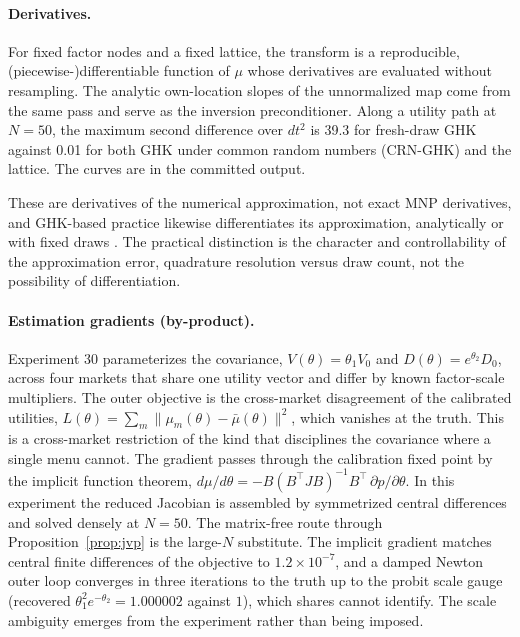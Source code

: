 \documentclass[12pt]{article}
\theoremstyle{remark}
\begin{document}
\paragraph{Derivatives.} For fixed factor nodes and a fixed
lattice, the transform is a reproducible, (piecewise-)differentiable function
of $\mu$ whose derivatives are evaluated without resampling. The analytic own-location slopes of the unnormalized map come from the same pass and serve as the inversion preconditioner. Along a utility path at $N=50$, the maximum second difference over
$dt^2$ is 39.3 for fresh-draw GHK against 0.01 for both GHK under common
random numbers (CRN-GHK) and the lattice. The curves are in the
committed output.

These are derivatives of the numerical
approximation, not exact MNP derivatives, and GHK-based practice likewise
differentiates its approximation, analytically or with fixed draws
\citep{hmr1996,hajivassiliou1998,train2009}. The practical distinction is the character and controllability of the
approximation error, quadrature resolution versus draw count, not the
possibility of differentiation.

\paragraph{Estimation gradients (by-product).} Experiment 30
parameterizes the covariance, $V(\theta) = \theta_1 V_0$ and
$D(\theta) = e^{\theta_2} D_0$, across four markets that share one
utility vector and differ by known factor-scale multipliers. The outer
objective is the cross-market disagreement of the calibrated utilities,
$L(\theta) = \sum_m \|\mu_m(\theta) - \bar\mu(\theta)\|^2$, which
vanishes at the truth. This is a cross-market restriction of the kind
that disciplines the covariance where a single menu cannot. The
gradient passes through the calibration fixed point by the implicit
function theorem, $d\mu/d\theta = -B(B^\top J B)^{-1}B^\top\,
\partial p/\partial\theta$. In this experiment the reduced Jacobian is
assembled by symmetrized central differences and solved densely at
$N = 50$. The matrix-free route through Proposition~\ref{prop:jvp} is
the large-$N$ substitute. The implicit gradient matches central finite
differences of the objective to $1.2\times10^{-7}$, and a damped Newton
outer loop converges in three iterations to the truth up to the probit
scale gauge (recovered $\theta_1^2 e^{-\theta_2} = 1.000002$ against
$1$), which shares cannot identify. The scale ambiguity emerges from
the experiment rather than being imposed.
\end{document}
